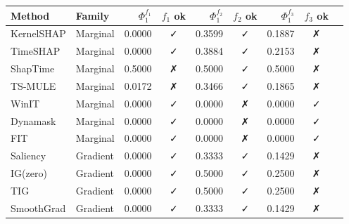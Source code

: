 \begin{tabular}{llrcrcrcc}
\toprule
Method & Family & $\Phi^{f_1}_1$ & $f_1$ ok & $\Phi^{f_2}_1$ & $f_2$ ok & $\Phi^{f_3}_1$ & $f_3$ ok \\
\midrule
KernelSHAP & Marginal & 0.0000 & ✓ & 0.3599 & ✓ & 0.1887 & ✗ \\
TimeSHAP & Marginal & 0.0000 & ✓ & 0.3884 & ✓ & 0.2153 & ✗ \\
ShapTime & Marginal & 0.5000 & ✗ & 0.5000 & ✓ & 0.5000 & ✗ \\
TS-MULE & Marginal & 0.0172 & ✗ & 0.3466 & ✓ & 0.1865 & ✗ \\
WinIT & Marginal & 0.0000 & ✓ & 0.0000 & ✗ & 0.0000 & ✓ \\
Dynamask & Marginal & 0.0000 & ✓ & 0.0000 & ✗ & 0.0000 & ✓ \\
FIT & Marginal & 0.0000 & ✓ & 0.0000 & ✗ & 0.0000 & ✓ \\
Saliency & Gradient & 0.0000 & ✓ & 0.3333 & ✓ & 0.1429 & ✗ \\
IG(zero) & Gradient & 0.0000 & ✓ & 0.5000 & ✓ & 0.2500 & ✗ \\
TIG & Gradient & 0.0000 & ✓ & 0.5000 & ✓ & 0.2500 & ✗ \\
SmoothGrad & Gradient & 0.0000 & ✓ & 0.3333 & ✓ & 0.1429 & ✗ \\
\bottomrule
\end{tabular}
